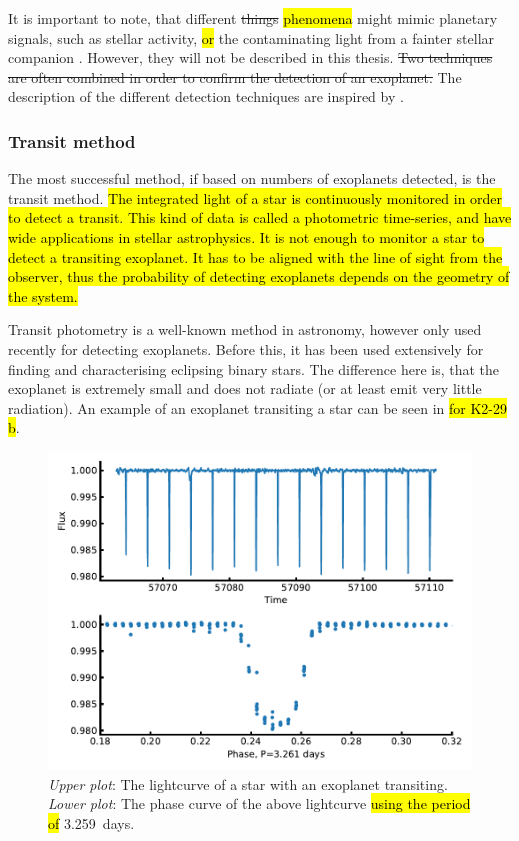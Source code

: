 It is important to note, that different \st{things} \hl{phenomena} might mimic planetary signals,
such as stellar activity, \hl{or} the contaminating light from a fainter stellar companion
\citep[see e.g.][]{Oshagh2013,Oshagh2014}. However, they will not be described in this thesis.
\st{Two techniques are often combined in order to confirm the detection of an exoplanet.} The
description of the different detection techniques are inspired by \citet{Seager2010}.


\subsubsection{Transit method}
\label{sec:transitMethod}

The most successful method, if based on numbers of exoplanets detected, is the transit method.
\hl{The integrated light of a star is continuously monitored in order to detect a transit. This kind
of data is called a photometric time-series, and have wide applications in stellar astrophysics. It
is not enough to monitor a star to detect a transiting exoplanet. It has to be aligned with the line
of sight from the observer, thus the probability of detecting exoplanets depends on the geometry of
the system.}

Transit photometry is a well-known method in astronomy, however only used recently for detecting
exoplanets. Before this, it has been used extensively for finding and characterising eclipsing
binary stars. The difference here is, that the exoplanet is extremely small and does not radiate (or
at least emit very little radiation). An example of an exoplanet transiting a star can be seen in
 \hl{for K2-29 b}.

\begin{figure}[htpb!]
    \centering
    \includegraphics[width=1.0\linewidth]{figures/transitMethod.pdf}
    \caption{\emph{Upper plot}: The lightcurve of a star with an exoplanet transiting.
             \emph{Lower plot}: The phase curve of the above lightcurve \hl{using the period of}
             \SI{3.259}{days}.}
    \label{fig:transitMethod}
\end{figure}

